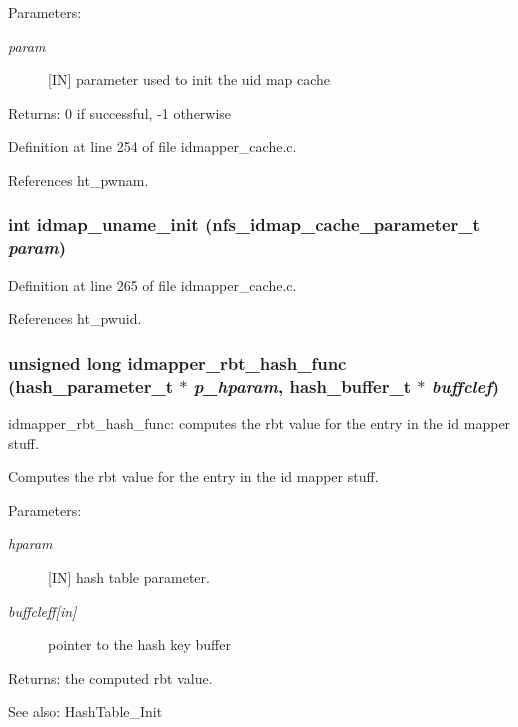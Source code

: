 \begin{Desc}
\item[Parameters:]
\begin{description}
\item[{\em param}][IN] parameter used to init the uid map cache\end{description}
\end{Desc}
\begin{Desc}
\item[Returns:]0 if successful, -1 otherwise \end{Desc}


Definition at line 254 of file idmapper\_\-cache.c.

References ht\_\-pwnam.
\subsubsection{\setlength{\rightskip}{0pt plus 5cm}int idmap\_\-uname\_\-init (nfs\_\-idmap\_\-cache\_\-parameter\_\-t {\em param})}\label{idmapper__cache_8c_a15}




Definition at line 265 of file idmapper\_\-cache.c.

References ht\_\-pwuid.
\subsubsection{\setlength{\rightskip}{0pt plus 5cm}unsigned long idmapper\_\-rbt\_\-hash\_\-func (hash\_\-parameter\_\-t $\ast$ {\em p\_\-hparam}, hash\_\-buffer\_\-t $\ast$ {\em buffclef})}\label{idmapper__cache_8c_a8}


idmapper\_\-rbt\_\-hash\_\-func: computes the rbt value for the entry in the id mapper stuff.

Computes the rbt value for the entry in the id mapper stuff.

\begin{Desc}
\item[Parameters:]
\begin{description}
\item[{\em hparam}][IN] hash table parameter. \item[{\em buffcleff\mbox{[}in\mbox{]}}]pointer to the hash key buffer\end{description}
\end{Desc}
\begin{Desc}
\item[Returns:]the computed rbt value.\end{Desc}
\begin{Desc}
\item[See also:]Hash\-Table\_\-Init \end{Desc}


